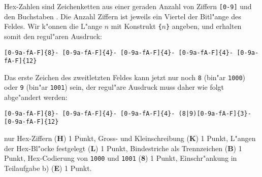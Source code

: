 \begin{loesung}
\begin{teilaufgaben}
\item
Hex-Zahlen sind Zeichenketten aus einer geraden Anzahl von
Ziffern \texttt{[0-9]} und den Buchstaben \text{[a-fA-F]}.
Die Anzahl Ziffern ist jeweils ein Viertel der Bitl"ange des Feldes.
Wir k"onnen die L"ange $n$ mit Konstrukt \texttt{\{$n$\}} angeben,
und erhalten somit den regul"aren Ausdruck:
\begin{center}
\texttt{[0-9a-fA-F]\{8\}-%
[0-9a-fA-F]\{4\}-%
[0-9a-fA-F]\{4\}-%
[0-9a-fA-F]\{4\}-%
[0-9a-fA-F]\{12\}}
\end{center}
\item
Das erste Zeichen des zweitletzten Feldes kann jetzt nur noch
\texttt{8} (bin"ar \texttt{1000}) oder \texttt{9} (bin"ar \texttt{1001})
sein, der regul"are Ausdruck muss daher wie folgt abge"andert
werden:
\begin{center}
\texttt{[0-9a-fA-F]\{8\}-%
[0-9a-fA-F]\{4\}-%
[0-9a-fA-F]\{4\}-%
(8|9)[0-9a-fA-F]\{3\}-%
[0-9a-fA-F]\{12\}}
\end{center}
\end{teilaufgaben}
\end{loesung}

\begin{bewertung}
nur Hex-Ziffern ({\bf H}) 1 Punkt,
Gross- und Kleinschreibung ({\bf K}) 1 Punkt,
L"angen der Hex-Bl"ocke festgelegt ({\bf L}) 1 Punkt,
Bindestriche als Trennzeichen ({\bf B}) 1 Punkt,
Hex-Codierung von \texttt{1000} und \texttt{1001} ({\bf 8}) 1 Punkt,
Einschr"ankung in Teilaufgabe b) ({\bf E}) 1 Punkt.
\end{bewertung}

